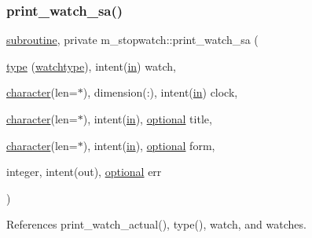 \subsubsection{\texorpdfstring{print\+\_\+watch\+\_\+sa()}{print\_watch\_sa()}}
{\footnotesize\ttfamily \hyperlink{M__stopwatch_83_8txt_acfbcff50169d691ff02d4a123ed70482}{subroutine}, private m\+\_\+stopwatch\+::print\+\_\+watch\+\_\+sa (\begin{DoxyParamCaption}\item[{\hyperlink{stop__watch_83_8txt_a70f0ead91c32e25323c03265aa302c1c}{type} (\hyperlink{structm__stopwatch_1_1watchtype}{watchtype}), intent(\hyperlink{M__journal_83_8txt_afce72651d1eed785a2132bee863b2f38}{in})}]{watch,  }\item[{\hyperlink{option__stopwatch_83_8txt_abd4b21fbbd175834027b5224bfe97e66}{character}(len=$\ast$), dimension(\+:), intent(\hyperlink{M__journal_83_8txt_afce72651d1eed785a2132bee863b2f38}{in})}]{clock,  }\item[{\hyperlink{option__stopwatch_83_8txt_abd4b21fbbd175834027b5224bfe97e66}{character}(len=$\ast$), intent(\hyperlink{M__journal_83_8txt_afce72651d1eed785a2132bee863b2f38}{in}), \hyperlink{option__stopwatch_83_8txt_aa4ece75e7acf58a4843f70fe18c3ade5}{optional}}]{title,  }\item[{\hyperlink{option__stopwatch_83_8txt_abd4b21fbbd175834027b5224bfe97e66}{character}(len=$\ast$), intent(\hyperlink{M__journal_83_8txt_afce72651d1eed785a2132bee863b2f38}{in}), \hyperlink{option__stopwatch_83_8txt_aa4ece75e7acf58a4843f70fe18c3ade5}{optional}}]{form,  }\item[{integer, intent(out), \hyperlink{option__stopwatch_83_8txt_aa4ece75e7acf58a4843f70fe18c3ade5}{optional}}]{err }\end{DoxyParamCaption})\hspace{0.3cm}{\ttfamily [private]}}



References print\+\_\+watch\+\_\+actual(), type(), watch, and watches.

\mbox{\label{namespacem__stopwatch_aefcb05a2035a7204aefdd3e88c5621cc}} 
